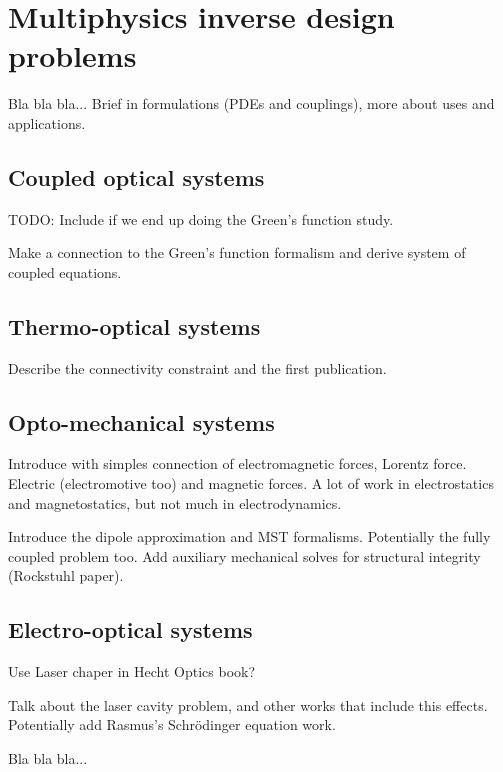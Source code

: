 \chapter{Multiphysics inverse design problems}

Bla bla bla... Brief in formulations (PDEs and couplings), more about uses and applications.






\section{Coupled optical systems}

TODO: Include if we end up doing the Green's function study.

 Make a connection to the Green's function formalism and derive system of coupled equations.

\section{Thermo-optical systems}

Describe the connectivity constraint and the first publication.

\section{Opto-mechanical systems}

Introduce with simples connection of electromagnetic forces, Lorentz force. Electric (electromotive too) and 
magnetic forces. A lot of work in electrostatics and magnetostatics, but not much in
electrodynamics.

Introduce the dipole approximation and MST formalisms. Potentially the fully coupled problem too.
Add auxiliary mechanical solves for structural integrity (Rockstuhl paper).

\section{Electro-optical systems}

Use Laser chaper in Hecht Optics book?

Talk about the laser cavity problem, and other works that include this effects.
Potentially add Rasmus's Schrödinger equation work.

Bla bla bla...